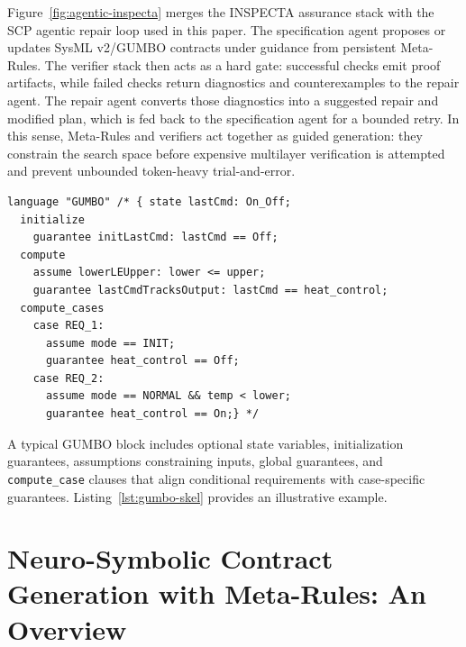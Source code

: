 \documentclass[conference]{IEEEtran}
\begin{document}
Figure~\ref{fig:agentic-inspecta} merges the INSPECTA assurance stack with the SCP agentic repair loop used in this paper. The specification agent proposes or updates SysML v2/GUMBO contracts under guidance from persistent Meta-Rules. The verifier stack then acts as a hard gate: successful checks emit proof artifacts, while failed checks return diagnostics and counterexamples to the repair agent. The repair agent converts those diagnostics into a suggested repair and modified plan, which is fed back to the specification agent for a bounded retry. In this sense, Meta-Rules and verifiers act together as guided generation: they constrain the search space before expensive multilayer verification is attempted and prevent unbounded token-heavy trial-and-error.

\begin{lstlisting}[caption={Illustrative example of a GUMBO contract on a SysML v2 component.},label={lst:gumbo-skel}]
language "GUMBO" /* { state lastCmd: On_Off; 
  initialize
    guarantee initLastCmd: lastCmd == Off;
  compute
    assume lowerLEUpper: lower <= upper;
    guarantee lastCmdTracksOutput: lastCmd == heat_control;
  compute_cases
    case REQ_1:
      assume mode == INIT;
      guarantee heat_control == Off;
    case REQ_2:
      assume mode == NORMAL && temp < lower;
      guarantee heat_control == On;} */
\end{lstlisting}


A typical GUMBO block includes optional state variables, initialization guarantees, assumptions constraining inputs, global guarantees, and \texttt{compute\_case} clauses that align conditional requirements with case-specific guarantees. Listing~\ref{lst:gumbo-skel} provides an illustrative example.
\section{Neuro-Symbolic Contract Generation with Meta-Rules: An Overview}
\label{sec:approach}


\end{document}

